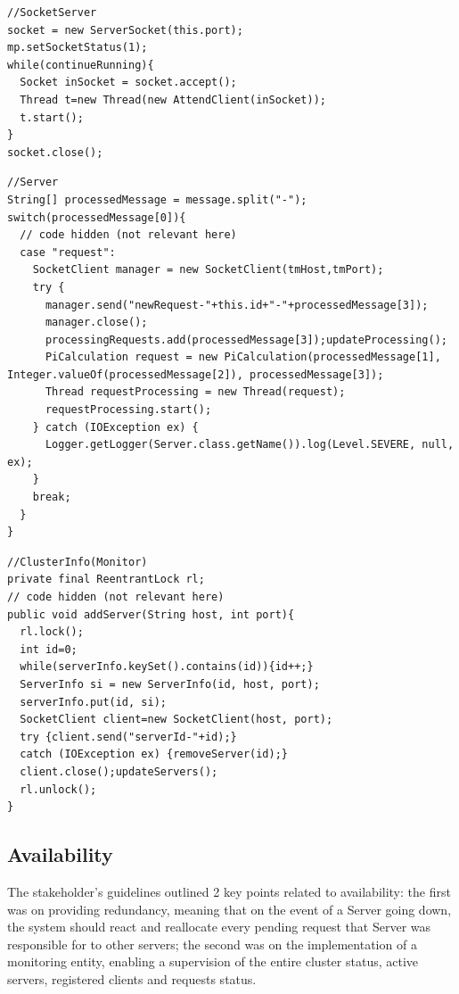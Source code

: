\documentclass[12pt]{article}
\begin{document}
\begin{lstlisting}
//SocketServer
socket = new ServerSocket(this.port);
mp.setSocketStatus(1);
while(continueRunning){
  Socket inSocket = socket.accept();
  Thread t=new Thread(new AttendClient(inSocket));
  t.start();
}
socket.close();
\end{lstlisting}

\begin{lstlisting}
//Server
String[] processedMessage = message.split("-");
switch(processedMessage[0]){
  // code hidden (not relevant here)
  case "request":
    SocketClient manager = new SocketClient(tmHost,tmPort);
    try {
      manager.send("newRequest-"+this.id+"-"+processedMessage[3]);
      manager.close();
      processingRequests.add(processedMessage[3]);updateProcessing();
      PiCalculation request = new PiCalculation(processedMessage[1], Integer.valueOf(processedMessage[2]), processedMessage[3]);
      Thread requestProcessing = new Thread(request);
      requestProcessing.start();
    } catch (IOException ex) {
      Logger.getLogger(Server.class.getName()).log(Level.SEVERE, null, ex);
    }
    break;
  }
}
\end{lstlisting}

\begin{lstlisting}
//ClusterInfo(Monitor)
private final ReentrantLock rl;
// code hidden (not relevant here)
public void addServer(String host, int port){
  rl.lock();
  int id=0;
  while(serverInfo.keySet().contains(id)){id++;}
  ServerInfo si = new ServerInfo(id, host, port);
  serverInfo.put(id, si);
  SocketClient client=new SocketClient(host, port);
  try {client.send("serverId-"+id);} 
  catch (IOException ex) {removeServer(id);}
  client.close();updateServers();
  rl.unlock();
}
\end{lstlisting}

\subsection{Availability} \label{availability}

The stakeholder's guidelines outlined 2 key points related to availability:
the first was on providing redundancy, meaning that on the event of a Server going down, the system should react and reallocate every pending request that Server
was responsible for to other servers;
the second was on the implementation of a monitoring entity, enabling a supervision of the entire cluster status, active servers, registered clients and requests status.
\end{document}
